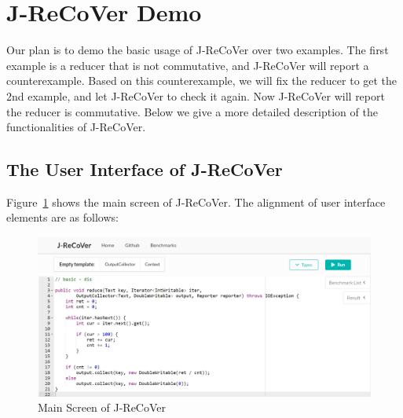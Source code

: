 % 
\clearpage
\appendix

\section{J-ReCoVer Demo}

Our plan is to demo the basic usage of J-ReCoVer over two examples. The first example is a reducer that is not commutative, and J-ReCoVer will report a counterexample. Based on this counterexample, we will fix the reducer to get the 2nd example, and let J-ReCoVer to check it again. Now J-ReCoVer will report the reducer is commutative. Below we give a more detailed description of the functionalities of J-ReCoVer. 

\subsection{The User Interface of J-ReCoVer}
\label{appendix:1}

Figure~\ref{fig:main_screen} shows the main screen of J-ReCoVer. The alignment of user interface elements are as follows:

\begin{figure}
\begin{center}
\includegraphics[width=.9\linewidth]{screenshots/main_screen}
\caption{Main Screen of J-ReCoVer}
\label{fig:main_screen}
\end{center}
\end{figure}

